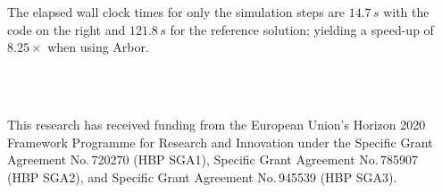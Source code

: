 \documentclass{beamer}
\begin{document}
\begin{frame}[t, fragile]
\begin{columns}[onlytextwidth]
\begin{column}{.49\linewidth}
      The elapsed wall clock times for only the simulation steps are $14.7\,s$
      with the code on the right and $121.8\,s$ for the reference solution;
      yielding a speed-up of $8.25\times$ when using Arbor.
    \end{column}
    \begin{column}{.49\linewidth}
      \inputminted[escapeinside=!!]{python}{src/model.py}
    \end{column}
  \end{columns}
  \vspace*{5ex}
  \begin{columns}[onlytextwidth]
    \begin{column}{.49\linewidth}
      \textbf{}\\

      \textbf{}\\
      This research has received funding from the European Union's Horizon 2020
      Framework Programme for Research and Innovation under the Specific Grant
      Agreement No.\,720270 (HBP SGA1), Specific Grant Agreement No.\,785907 (HBP
      SGA2), and Specific Grant Agreement No.\,945539 (HBP SGA3).\\[1.5ex]
    \end{column}
    \begin{column}{.49\linewidth}
      \textbf{}\\
      \printbibliography{}
    \end{column}
  \end{columns}
\end{frame}
\end{document}
